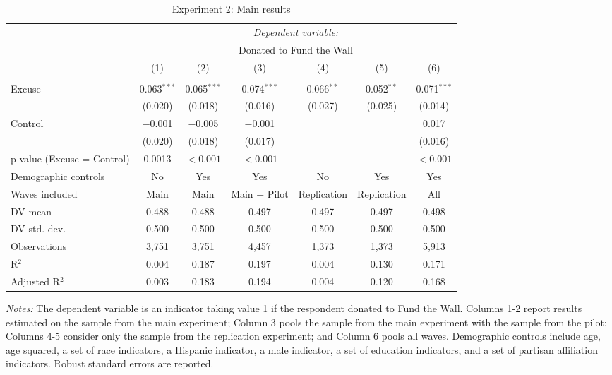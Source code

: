 
\begin{table}[!htbp] \centering 
  \caption{Experiment 2: Main results} 
  \label{t:2-main} 
\begin{threeparttable}
\begin{tabular}{@{\hspace{5pt}}l@{\hspace{5pt}}cccccc} 
\toprule 
 & \multicolumn{6}{c}{\textit{Dependent variable:}} \\ 
\cmidrule(rr){2-7} 
 & \multicolumn{6}{c}{Donated to Fund the Wall} \\ 
 \cmidrule(rr){2-7}
 & (1) & (2) & (3) & (4) & (5) & (6)\\ 
\midrule  
\\[-2.1ex] Excuse & 0.063$^{***}$ & 0.065$^{***}$ & 0.074$^{***}$ & 0.066$^{**}$ & 0.052$^{**}$ & 0.071$^{***}$ \\ 
  & (0.020) & (0.018) & (0.016) & (0.027) & (0.025) & (0.014) \\ 
 \addlinespace 
 Control & $-$0.001 & $-$0.005 & $-$0.001 &  &  & 0.017 \\ 
  & (0.020) & (0.018) & (0.017) &  &  & (0.016) \\ 
 \addlinespace 
p-value (Excuse = Control) & 0.0013 & $<0.001$ & $<0.001$ &  &  & $<0.001$ \\ 
\midrule  
Demographic controls & No & Yes & Yes & No & Yes & Yes \\ 
Waves included & Main & Main & Main + Pilot & Replication & Replication & All \\ 
\midrule
\addlinespace
DV mean & 0.488 & 0.488 & 0.497 & 0.497 & 0.497 & 0.498 \\
DV std. dev. & 0.500 & 0.500 & 0.500 & 0.500 & 0.500 & 0.500 \\
Observations & 3,751 & 3,751 & 4,457 & 1,373 & 1,373 & 5,913 \\ 
R$^{2}$ & 0.004 & 0.187 & 0.197 & 0.004 & 0.130 & 0.171 \\ 
Adjusted R$^{2}$ & 0.003 & 0.183 & 0.194 & 0.004 & 0.120 & 0.168 \\ 
\bottomrule 
\end{tabular} 
\begin{tablenotes}
\footnotesize
\item \textit{Notes:} The dependent variable is an indicator taking value 1 if the respondent donated to Fund the Wall. Columns 1-2 report results estimated on the sample from the main experiment; Column 3 pools the sample from the main experiment with the sample from the pilot; Columns 4-5 consider only the sample from the replication experiment; and Column 6 pools all waves. Demographic controls include age, age squared, a set of race indicators, a Hispanic indicator, a male indicator, a set of education indicators, and a set of partisan affiliation indicators. Robust standard errors are reported.
\end{tablenotes}
\end{threeparttable}
\end{table} 
